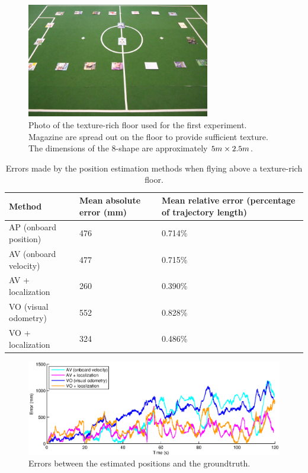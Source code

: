 \begin{figure}[htb!]
\centering
\includegraphics[width=8cm]{images/exp1-floor.jpg}
\caption{Photo of the texture-rich floor used for the first experiment. Magazine are spread out on the floor to provide sufficient texture. The dimensions of the 8-shape are approximately $5\small{m} \times 2.5\small{m}$.}
\label{fig:exp1-floor}
\end{figure}

\begin{table}[htb!]
    \centering
    \begin{tabular}
        { | l | l | l | } 
	\hline
	Method & Mean absolute error (\small{mm}) & Mean relative error (percentage of trajectory length) \\
        \hline
	AP (onboard position) & 476 & 0.714\% \\
        AV (onboard velocity) & 477 & 0.715\% \\
	AV + localization & 260 & 0.390\% \\
	VO (visual odometry) & 552 & 0.828\% \\
	VO + localization & 324 & 0.486\% \\
	\hline
    \end{tabular}
    \caption{Errors made by the position estimation methods when flying above a texture-rich floor.}
    \label{tab:res_mapping}
\end{table}

\begin{figure}[htb!]
\centering
\includegraphics[width=\linewidth]{images/exp1-run13-error.eps}
\caption{Errors between the estimated positions and the groundtruth.}
\label{fig:exp1-texture-error}
\end{figure}

